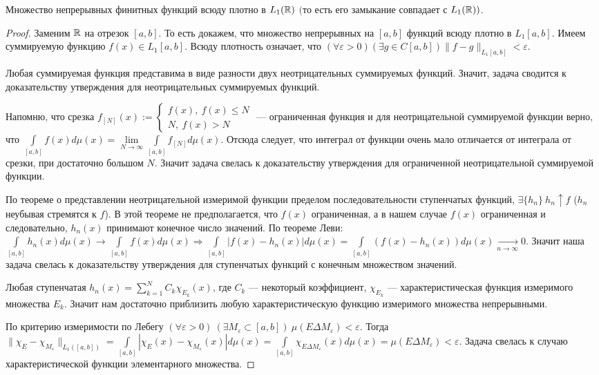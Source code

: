 \begin{lemma}
	Множество непрерывных финитных функций всюду плотно в $L_1(\mathbb{R})$ $($то есть его замыкание совпадает с $L_1(\mathbb{R}))$.
\end{lemma}
\begin{proof}
	Заменим $\mathbb{R}$ на отрезок $[a,b]$. То есть докажем, что множество непрерывных на $[a,b]$ функций всюду плотно в $L_1[a,b]$. Имеем суммируемую функцию $f(x)\in L_1[a,b]$. Всюду плотность означает, что ${(\forall\varepsilon >0)} {(\exists g\in C[a,b])} \parallel f-g\parallel_{L_1[a,b]}<\varepsilon$.
	
  Любая суммируемая функция представима в виде разности двух неотрицательных суммируемых функций. Значит, задача сводится к доказательству утверждения для неотрицательных суммируемых функций.
 
 Напомню, что срезка $f_{[N]} (x) := \begin{cases}
 	f(x),\ f(x)\leqslant N\\
 	N,\ f(x) > N
 \end{cases}$ --- ограниченная функция и для неотрицательной суммируемой функции верно, что $\int\limits_{[a,b]}f(x)d\mu(x)=\lim\limits_{N\to\infty}\int\limits_{[a,b]}f_{[N]}d\mu(x)$.  Отсюда следует, что интеграл от функции очень мало отличается от интеграла от срезки, при достаточно большом $N$. Значит задача свелась к доказательству утверждения для ограниченной неотрицательной суммируемой функции.
 
 По теореме о представлении неотрицательной измеримой функции пределом последовательности ступенчатых функций, $\exists \{h_n\}\  h_n \uparrow f$ ($h_n$ неубывая стремятся к $f$). В этой теореме не предполагается, что $f(x)$ ограниченная, а в нашем случае $f(x)$ ограниченная и следовательно, $h_n(x)$ принимают конечное число значений. По теореме Леви: 
		$	\int\limits_{[a,b]} h_n(x)d\mu(x)\rightarrow \int\limits_{[a,b]}f(x)d\mu(x)\Rightarrow
			\int\limits_{[a,b]}|f(x)-h_n(x)|d\mu(x)=\int\limits_{[a,b]}(f(x)-h_n(x))d\mu(x)\underset{n\to\infty}{\to}0.$
Значит наша задача свелась к доказательству утверждения для ступенчатых функций с конечным множеством значений.

Любая ступенчатая $h_n(x)=\sum\limits_{k=1}^N C_k\chi_{E_k}(x)$, где $C_k$ --- некоторый коэффициент, $\chi_{E_k}$ --- характеристическая функция измеримого множества $E_k$. Значит нам достаточно приблизить любую характеристическую функцию измеримого множества непрерывными.
		
По критерию измеримости по Лебегу $(\forall\varepsilon>0)\ (\exists M_\varepsilon\subset[a,b])\  \mu(E\Delta M_\varepsilon)<\varepsilon$. Тогда ${\parallel \chi_E - \chi_{M_\varepsilon}\parallel_{L_1([a,b])}=\int\limits_{[a,b]}|\chi_{E}(x)-\chi_{M_\varepsilon}(x)|d\mu(x)=\int\limits_{[a,b]}\chi_{E\Delta M_\varepsilon}(x)d\mu(x)=\mu(E\Delta M_\varepsilon)<\varepsilon}$. Задача свелась к случаю характеристической функции элементарного множества.
		

\end{proof}
